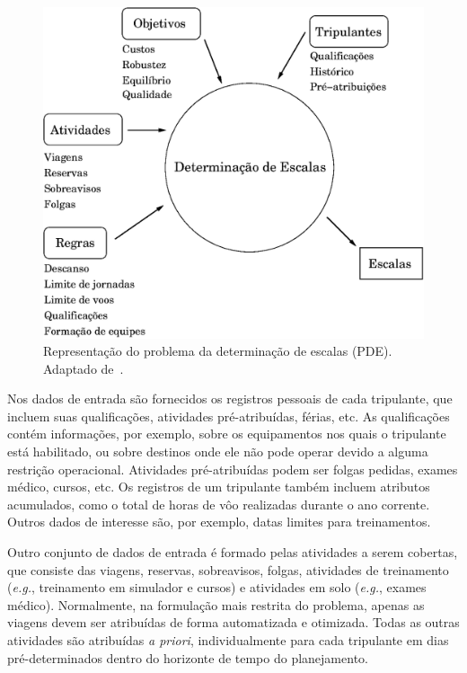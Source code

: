 \documentclass[12pt,a4paper]{article}
\newcommand{\eg}{\emph{e.g.}}                               %
\begin{document}
\begin{figure}[htbp]
	\begin{center}
		\includegraphics[scale=0.5]{fig/pde.eps}
		\caption{Representação do problema da determinação de escalas (PDE). Adaptado de~\cite{kohl04}.} 
		\label{fig:pde}
	\end{center}
\end{figure}

Nos dados de entrada são fornecidos os registros pessoais de cada tripulante, que incluem suas
qualificações, atividades pré-atribuídas, férias, etc. As qualificações contém informações, por
exemplo, sobre os equipamentos nos quais o tripulante está habilitado, ou sobre destinos onde ele
não pode operar devido a alguma restrição operacional. Atividades pré-atribuídas podem ser
folgas pedidas, exames médico, cursos, etc. Os registros de um tripulante também incluem atributos
acumulados, como o total de horas de vôo realizadas durante o ano corrente. Outros dados de
interesse são, por exemplo, datas limites para treinamentos.

Outro conjunto de dados de entrada é formado pelas atividades a serem cobertas, que consiste das
viagens, reservas, sobreavisos, folgas, atividades de treinamento (\eg, treinamento em simulador e
cursos) e atividades em solo (\eg, exames médico). Normalmente, na formulação mais restrita do
problema, apenas as viagens devem ser atribuídas de forma automatizada e otimizada. Todas as outras
atividades são atribuídas \emph{a priori}, individualmente para cada tripulante em dias
pré-determinados dentro do horizonte de tempo do planejamento.
\end{document}
